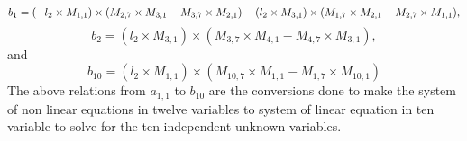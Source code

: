 \documentclass[10pt]{asme2ej}
\begin{document}
\begin{landscape}
\begin{equation}
    b_1 = (-l_2\times M_{1,1})\times(M_{2,7}\times M_{3,1}-M_{3,7}\times M_{2,1})\\ - (l_2\times M_{3,1})\times(M_{1,7}\times M_{2,1}-M_{2,7}\times M_{1,1}),
\end{equation}
\begin{equation}
    b_2 = (l_2\times M_{3,1})\times(M_{3,7}\times M_{4,1}-M_{4,7}\times M_{3,1}),
\end{equation}
and
\begin{equation}
    b_10 = (l_2\times M_{1,1})\times(M_{10,7}\times M_{1,1}-M_{1,7}\times M_{10,1})
\end{equation}
\normalsize
The above relations from $a_{1,1}$ to $b_10$ are the conversions done to make the system of  non linear equations in twelve variables to system of linear equation in ten variable to solve for the ten independent unknown variables.
\end{landscape}
\end{document}
